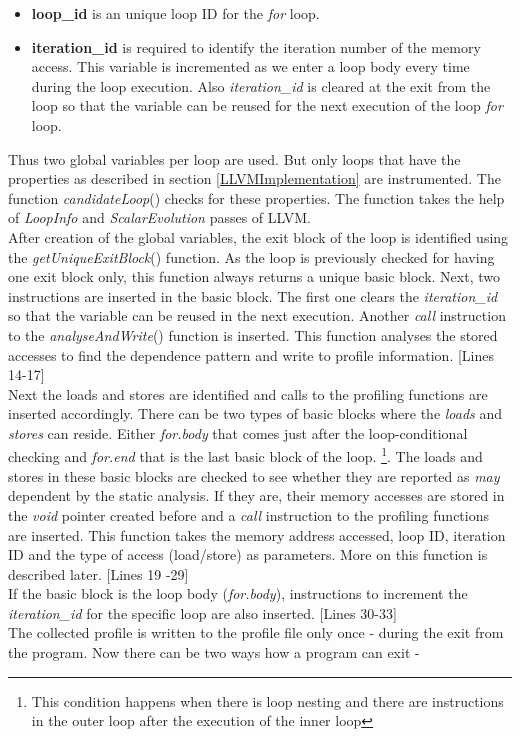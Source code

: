\documentclass[10pt]{report}          %
\begin{document}
\begin{itemize}

\item \textbf{loop\_id} is an unique loop ID for the \textit{for} loop.
\item \textbf{iteration\_id} is required to identify the iteration number of the memory access.  This variable is incremented as we enter a loop body every time during the loop execution.  Also \textit{iteration\_id} is cleared at the exit from the loop so that the variable can be reused for the next execution of the loop \textit{for} loop.

\end{itemize}

Thus two global variables per loop are used. But only loops that have the properties as described in section \ref{LLVMImplementation} are instrumented.  The function \textit{candidateLoop}() checks for these properties.  The function takes the help of \textit{LoopInfo} and \textit{ScalarEvolution} passes of LLVM. \\
After creation of the global variables, the exit block of the loop is identified using the \textit{getUniqueExitBlock}() function.  As the loop is previously checked for having one exit block only, this function always returns a unique basic block.  Next, two instructions are inserted in the basic block.  The first one clears the \textit{iteration\_id} so that the variable can be reused in the next execution.  Another \textit{call} instruction  to the \textit{analyseAndWrite}() function is inserted. This function analyses the stored accesses to find the dependence pattern and write to profile  information. [Lines 14-17] \\
Next the loads and stores are identified and calls to the profiling functions are inserted accordingly.  There can be two types of basic blocks where the \textit{loads} and \textit{stores} can reside.  Either \textit{for.body} that comes just after the loop-conditional checking and \textit{for.end} that is the last basic block of the loop. \footnote{This condition happens when there is loop nesting and there are instructions in the outer loop after the execution of the inner loop}.  The loads and stores in these basic blocks are checked to see whether they are reported as \textit{may} dependent by the static analysis.  If they are, their memory accesses are stored in the \textit{void} pointer created before and a \textit{call} instruction to the profiling functions are inserted.  This function takes the memory address accessed, loop ID, iteration ID and the type of access (load/store) as parameters. More on this function is described later. [Lines 19 -29] \\
If the basic block is the loop body (\textit{for.body}), instructions to increment the \textit{iteration\_id} for the specific loop are also inserted. [Lines 30-33] \\
The collected profile is written to the profile file only once - during the exit from the program.  Now there can be two ways how a program can exit - 
\end{document}
